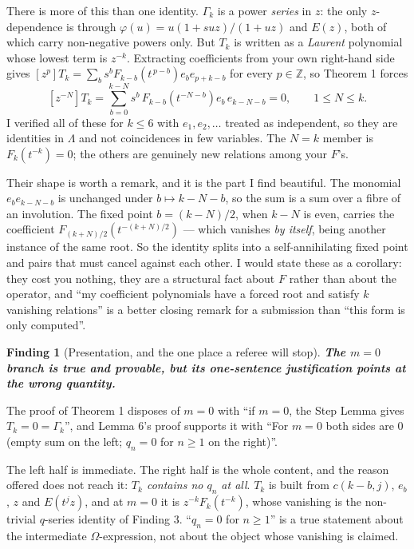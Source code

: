 \documentclass[11pt]{article}
\newtheorem{finding}{Finding}
\newcommand{\Fn}{F}
\begin{document}
There is more of this than one identity. $\Gamma_k$ is a power \emph{series} in $z$: the only
$z$-dependence is through $\varphi(u)=u(1+suz)/(1+uz)$ and $E(z)$, both of which carry
non-negative powers only. But $T_k$ is written as a \emph{Laurent} polynomial whose lowest
term is $z^{-k}$. Extracting coefficients from your own right-hand side gives
$[z^{p}]T_k=\sum_{b}s^b\Fn_{k-b}(t^{\,p-b})e_be_{p+k-b}$ for every $p\in\mathbb{Z}$, so
Theorem 1 forces
\[
  [z^{-N}]T_k=\sum_{b=0}^{k-N}s^{b}\,\Fn_{k-b}\!\left(t^{-N-b}\right)e_b\,e_{k-N-b}=0,
  \qquad 1\le N\le k .
\]
I verified all of these for $k\le6$ with $e_1,e_2,\dots$ treated as independent, so they are
identities in $\Lambda$ and not coincidences in few variables. The $N=k$ member is
$\Fn_k(t^{-k})=0$; the others are genuinely new relations among your $\Fn$'s.

Their shape is worth a remark, and it is the part I find beautiful. The monomial
$e_be_{k-N-b}$ is unchanged under $b\mapsto k-N-b$, so the sum is a sum over a fibre of an
involution. The fixed point $b=(k-N)/2$, when $k-N$ is even, carries the coefficient
$\Fn_{(k+N)/2}\!\left(t^{-(k+N)/2}\right)$ --- which vanishes \emph{by itself}, being another
instance of the same root. So the identity splits into a self-annihilating fixed point and
pairs that must cancel against each other. I would state these as a corollary: they cost you
nothing, they are a structural fact about $\Fn$ rather than about the operator, and ``my
coefficient polynomials have a forced root and satisfy $k$ vanishing relations'' is a better
closing remark for a submission than ``this form is only computed''.

\begin{finding}[Presentation, and the one place a referee will stop]
\textbf{The $m=0$ branch is true and provable, but its one-sentence justification points at
the wrong quantity.}
\end{finding}

The proof of Theorem 1 disposes of $m=0$ with ``if $m=0$, the Step Lemma gives
$T_k=0=\Gamma_k$'', and Lemma 6's proof supports it with ``For $m=0$ both sides are 0 (empty
sum on the left; $q_n=0$ for $n\ge1$ on the right)''.

The left half is immediate. The right half is the whole content, and the reason offered does
not reach it: \emph{$T_k$ contains no $q_n$ at all}. $T_k$ is built from $c(k-b,j)$, $e_b$,
$z$ and $E(t^jz)$, and at $m=0$ it is $z^{-k}\Fn_k(t^{-k})$, whose vanishing is the
non-trivial $q$-series identity of Finding 3. ``$q_n=0$ for $n\ge1$'' is a true statement
about the intermediate $\Omega$-expression, not about the object whose vanishing is claimed.
\end{document}
